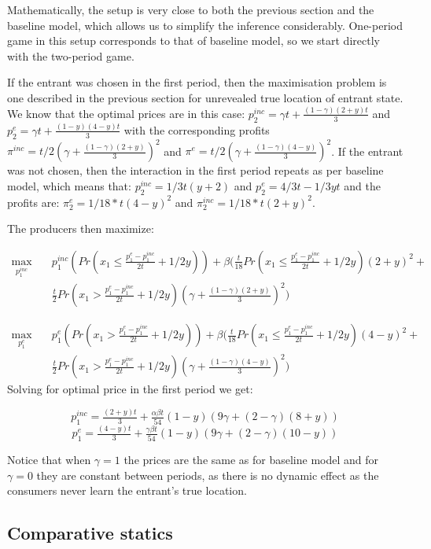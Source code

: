 \documentclass{article}
\begin{document}
Mathematically, the setup is very close to both the previous section and the baseline model, which allows us to simplify the inference considerably. One-period game in this setup corresponds to that of baseline model, so we start directly with the two-period game.

If the entrant was chosen in the first period, then the maximisation problem is one described in the previous section for unrevealed true location of entrant state. We know that the optimal prices are in this case: $p^{inc}_2 = \gamma t + \tfrac{(1-\gamma)(2+y)t}{3}$ and $p^{e}_2 = \gamma t + \tfrac{(1-y)(4-y)t}{3}$ with the corresponding profits $\pi^{inc} = t/2(\gamma + \tfrac{(1-\gamma)(2+y)}{3})^2$ and $\pi^{e} = t/2(\gamma + \tfrac{(1-\gamma)(4-y)}{3})^2$. If the entrant was not chosen, then the interaction in the first period repeats as per baseline model, which means that: $p^{inc}_2 =1/3t(y+ 2)$ and $ p^{e}_2 =4/3t - 1/3yt$ and the profits are:  $\pi_{2}^{e} = 1/18*t(4-y)^2$ and $\pi_{2}^{inc}=1/18*t(2+y)^2$. 

The producers then maximize:

$$ \begin{aligned}
    \max_{p^{inc}_1} {}
    & \quad p^{inc}_1(Pr(x_1 \leq \frac{p^{e}_1-p^{inc}_1}{2t} + 1/2y)) + \beta(\tfrac{t}{18} Pr(x_1 \leq \frac{p^{e}_1-p^{inc}_1}{2t} + 1/2y)(2+y)^2 + 	\\
    & \quad \tfrac{t}{2}Pr(x_1 > \frac{p^{e}_1-p^{inc}_1}{2t} + 1/2y)(\gamma + \tfrac{(1-\gamma)(2+y)}{3})^2)
    \end{aligned}
    $$
   
$$ \begin{aligned}
    \max_{p^{e}_1} {}
    & \quad p^{e}_1(Pr(x_1 > \frac{p^{e}_1-p^{inc}_1}{2t} + 1/2y)) + \beta(\tfrac{t}{18} Pr(x_1 \leq \frac{p^{e}_1-p^{inc}_1}{2t} + 1/2y)(4-y)^2 + 	\\
    & \quad \tfrac{t}{2}Pr(x_1 > \frac{p^{e}_1-p^{inc}_1}{2t} + 1/2y)(\gamma + \tfrac{(1-\gamma)(4-y)}{3})^2)
    \end{aligned}
    $$
Solving for optimal price in the first period we get: 

$$p^{inc}_1 = \tfrac{(2+y)t}{3} + \tfrac{\alpha \beta t}{54}(1-y)(9\gamma + (2-\gamma)(8+y))$$
$$p^{e}_1 = \tfrac{(4-y)t}{3} + \tfrac{\gamma \beta t}{54}(1-y)(9 \gamma + (2-\gamma)(10-y))$$

Notice that when $\gamma = 1$ the prices are the same as for baseline model and for $\gamma = 0$ they are constant between periods, as there is no dynamic effect as the consumers never learn the entrant's true location.

\subsection{Comparative statics}



%
    
\end{document}
